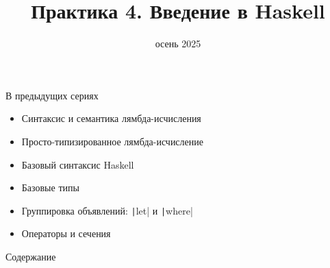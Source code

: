 
\newif\ifhandout




\title[4. Введение в Haskell]{Практика 4. Введение в Haskell}
\date{осень 2025}



    \mymaketitle

    \begin{frame}{В предыдущих сериях}
        \begin{itemize}
            \item Синтаксис и семантика лямбда-исчисления
            \item Просто-типизированное лямбда-исчисление
            \item[\newtopic] Базовый синтаксис Haskell
            \item[\newtopic] Базовые типы
            \item[\newtopic] Группировка объявлений: \texttt|let| и \texttt|where|
            \item[\newtopic] Операторы и сечения
        \end{itemize}
    \end{frame}

    \begin{frame}[noframenumbering]{Содержание}
        \tableofcontents
    \end{frame}

